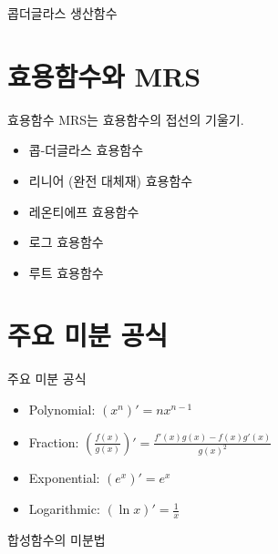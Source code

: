 \documentclass[aspectratio=169]{beamer}
\begin{document}
\begin{frame}{콥더글라스 생산함수}
  
\end{frame}

\section{효용함수와 MRS}
\begin{frame}{효용함수}
  MRS는 효용함수의 접선의 기울기.
  \begin{itemize}
    \item 콥-더글라스 효용함수%
    \item 리니어 (완전 대체재) 효용함수%
    \item 레온티에프 효용함수 %
    \item 로그 효용함수 %
    \item 루트 효용함수 %
  \end{itemize}
\end{frame}


\section{주요 미분 공식}

\begin{frame}{주요 미분 공식}
  \begin{itemize}
    \item Polynomial: \( (x^n)'=nx^{n-1} \)
    \item Fraction: \( \left(\frac{f(x)}{g(x)}\right)'=\frac{f'(x)g(x)-f(x)g'(x)}{g(x)^2} \)
    \item Exponential: \( (e^x)'=e^x \)
    \item Logarithmic: \( (\ln x)'=\frac{1}{x} \)
  \end{itemize}
\end{frame}

\begin{frame}{합성함수의 미분법}
  
\end{frame}

\end{document}
